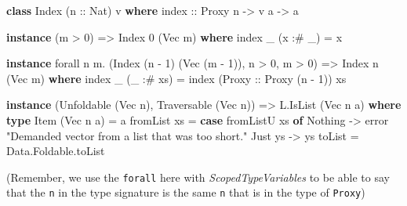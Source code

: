 \documentclass[]{article}
\newenvironment{Shaded}{}{}
\newcommand{\KeywordTok}[1]{\textcolor[rgb]{0.00,0.44,0.13}{\textbf{#1}}}
\newcommand{\DataTypeTok}[1]{\textcolor[rgb]{0.56,0.13,0.00}{#1}}
\newcommand{\DecValTok}[1]{\textcolor[rgb]{0.25,0.63,0.44}{#1}}
\newcommand{\StringTok}[1]{\textcolor[rgb]{0.25,0.44,0.63}{#1}}
\newcommand{\OtherTok}[1]{\textcolor[rgb]{0.00,0.44,0.13}{#1}}
\newcommand{\FunctionTok}[1]{\textcolor[rgb]{0.02,0.16,0.49}{#1}}
\newcommand{\NormalTok}[1]{#1}
\begin{document}
\begin{Shaded}
\begin{Highlighting}[]
\KeywordTok{class} \DataTypeTok{Index}\NormalTok{ (}\OtherTok{n ::} \DataTypeTok{Nat}\NormalTok{) v }\KeywordTok{where}
\OtherTok{    index ::} \DataTypeTok{Proxy}\NormalTok{ n }\OtherTok{->}\NormalTok{ v a }\OtherTok{->}\NormalTok{ a}

\KeywordTok{instance}\NormalTok{ (m }\FunctionTok{>} \DecValTok{0}\NormalTok{) }\OtherTok{=>} \DataTypeTok{Index} \DecValTok{0}\NormalTok{ (}\DataTypeTok{Vec}\NormalTok{ m) }\KeywordTok{where}
\NormalTok{    index _ (x }\FunctionTok{:#}\NormalTok{ _) }\FunctionTok{=}\NormalTok{ x}

\KeywordTok{instance}\NormalTok{ forall n m}\FunctionTok{.}\NormalTok{ (}\DataTypeTok{Index}\NormalTok{ (n }\FunctionTok{-} \DecValTok{1}\NormalTok{) (}\DataTypeTok{Vec}\NormalTok{ (m }\FunctionTok{-} \DecValTok{1}\NormalTok{)), n }\FunctionTok{>} \DecValTok{0}\NormalTok{, m }\FunctionTok{>} \DecValTok{0}\NormalTok{) }\OtherTok{=>} \DataTypeTok{Index}\NormalTok{ n (}\DataTypeTok{Vec}\NormalTok{ m) }\KeywordTok{where}
\NormalTok{    index _ (_ }\FunctionTok{:#}\NormalTok{ xs) }\FunctionTok{=}\NormalTok{ index (}\DataTypeTok{Proxy}\OtherTok{ ::} \DataTypeTok{Proxy}\NormalTok{ (n }\FunctionTok{-} \DecValTok{1}\NormalTok{)) xs}

\KeywordTok{instance}\NormalTok{ (}\DataTypeTok{Unfoldable}\NormalTok{ (}\DataTypeTok{Vec}\NormalTok{ n), }\DataTypeTok{Traversable}\NormalTok{ (}\DataTypeTok{Vec}\NormalTok{ n)) }\OtherTok{=>} \DataTypeTok{L.IsList}\NormalTok{ (}\DataTypeTok{Vec}\NormalTok{ n a) }\KeywordTok{where}
    \KeywordTok{type} \DataTypeTok{Item}\NormalTok{ (}\DataTypeTok{Vec}\NormalTok{ n a) }\FunctionTok{=}\NormalTok{ a}
\NormalTok{    fromList xs }\FunctionTok{=} \KeywordTok{case}\NormalTok{ fromListU xs }\KeywordTok{of}
                    \DataTypeTok{Nothing} \OtherTok{->}\NormalTok{ error }\StringTok{"Demanded vector from a list that was too short."}
                    \DataTypeTok{Just}\NormalTok{ ys }\OtherTok{->}\NormalTok{ ys}
\NormalTok{    toList      }\FunctionTok{=}\NormalTok{ Data.Foldable.toList}
\end{Highlighting}
\end{Shaded}

(Remember, we use the \texttt{forall} here with \emph{ScopedTypeVariables} to be
able to say that the \texttt{n} in the type signature is the same \texttt{n}
that is in the type of \texttt{Proxy})
\end{document}
